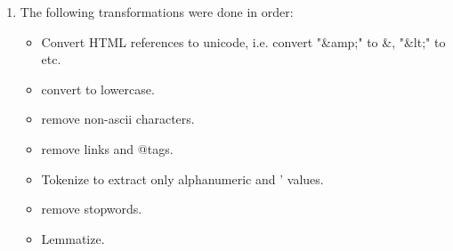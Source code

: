 \documentclass[12pt]{article}
\begin{document}
\begin{enumerate}[label=(\alph*)]
\begin{itemize}
\begin{center}
\begin{tabular}{c c}
\begin{tabular}{r|c|c|c}
                                PNu & 514 & 213 & 417 \\
                                \hline
                                PN  & 459 & 204 & 405 \\
                                \hline
                            \end{tabular}
                        \end{tabular}
                    \end{center}
                    \begin{center}
                        \begin{tabular}{c}
                            All Positive \\
                            \begin{tabular}{r|c|c|c}
                                    & AP   & ANu & AN   \\
                                \hline
                                PP  & 1444 & 617 & 1232 \\
                                \hline
                                PNu & 0    & 0   & 0    \\
                                \hline
                                PN  & 0    & 0   & 0    \\
                                \hline
                            \end{tabular}
                        \end{tabular}
                    \end{center}
          \end{itemize}


          We can show that the Naive Bayes classifier has much higher accuracy than random guessing or constant classification.

    \item The following transformations were done in order:
          \begin{itemize}
              \item Convert HTML references to unicode, i.e. convert "\&amp;" to \&, "\&lt;" to \< etc.
              \item convert to lowercase.
              \item remove non-ascii characters.
              \item remove links and @tags.
              \item Tokenize to extract only alphanumeric and ' values.
              \item remove stopwords.
              \item Lemmatize.
          \end{itemize}


\end{enumerate}
\end{document}

